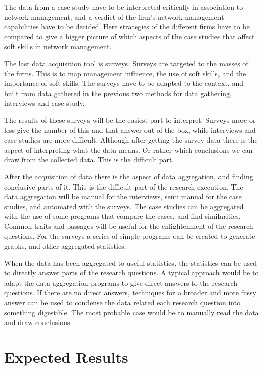 \documentclass[12pt,journal,compsoc]{IEEEtran}
\begin{document}
The data from a case study have to be interpreted critically in association to
network management, and a verdict of the firm's network management capabilities
have to be decided. Here strategies of the different firms have to be compared
to give a bigger picture of which aspects of the case studies that affect soft
skills in network management.  

The last data acquisition tool is surveys. Surveys are targeted to the masses
of the firms. This is to map management influence, the use of soft skills, and
the importance of soft skills. The surveys have to be adapted to the context,
and built from data gathered in the previous two methods for data gathering,
interviews and case study.   

The results of these surveys will be the easiest part to interpret. Surveys
more or less give the number of this and that answer out of the box, while
interviews and case studies are more difficult. Although after getting the
survey data there is the aspect of interpreting what the data means. Or rather
which conclusions we can draw from the collected data. This is the difficult
part.  

After the acquisition of data there is the aspect of data aggregation, and
finding conclusive parts of it. This is the difficult part of the research
execution. The data aggregation will be manual for the interviews, semi manual
for the case studies, and automated with the surveys. The case studies can be
aggregated with the use of some programs that compare the cases, and find
similarities. Common traits and passages will be useful for the enlightenment
of the research questions. For the surveys a series of simple programs can be
created to generate graphs, and other aggregated statistics. 

When the data has been aggregated to useful statistics, the statistics can be
used to directly answer parts of the research questions. A typical approach
would be to adapt the data aggregation programs to give direct answers to the
research questions. If there are no direct answers, techniques for a broader
and more fussy answer can be used to condense the data related each research
question into something digestible. The most probable case would be to manually
read the data and draw conclusions.  

\section{Expected Results}
\end{document}
